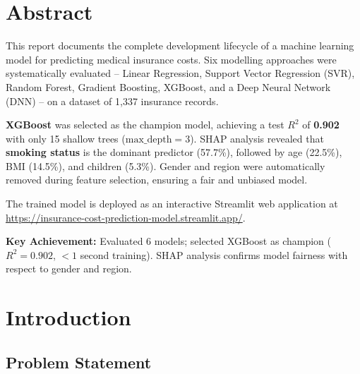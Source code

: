 \documentclass[12pt,a4paper]{report}
\begin{document}
\begin{titlepage}
\end{titlepage}

\chapter*{Abstract}

This report documents the complete development lifecycle of a machine learning model for predicting medical insurance costs. Six modelling approaches were systematically evaluated -- Linear Regression, Support Vector Regression (SVR), Random Forest, Gradient Boosting, XGBoost, and a Deep Neural Network (DNN) -- on a dataset of 1,337 insurance records.

\textbf{XGBoost} was selected as the champion model, achieving a test $R^2$ of \textbf{0.902} with only 15 shallow trees ($\text{max\_depth}=3$). SHAP analysis revealed that \textbf{smoking status} is the dominant predictor (57.7\%), followed by age (22.5\%), BMI (14.5\%), and children (5.3\%). Gender and region were automatically removed during feature selection, ensuring a fair and unbiased model.

The trained model is deployed as an interactive Streamlit web application at \url{https://insurance-cost-prediction-model.streamlit.app/}.

\begin{infobox}
\textbf{Key Achievement:} Evaluated 6 models; selected XGBoost as champion ($R^2 = 0.902$, $< 1$ second training). SHAP analysis confirms model fairness with respect to gender and region.
\end{infobox}

\tableofcontents

\chapter{Introduction}

\section{Problem Statement}
\end{document}
